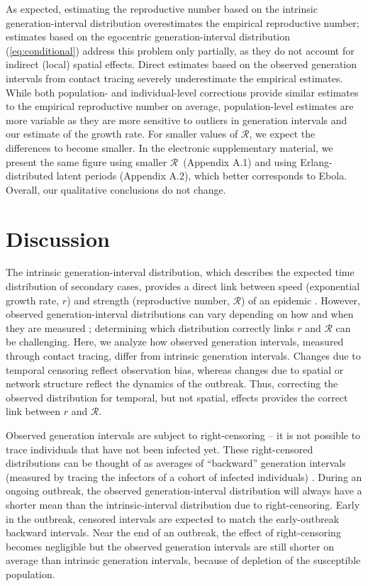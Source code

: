 \documentclass[12pt]{article}
\newcommand{\eref}[1]{(\ref{eq:#1})}
\newcommand{\RR}{\ensuremath{{\mathcal R}}}
\begin{document}
As expected, estimating the reproductive number based on the intrinsic generation-interval distribution overestimates the empirical reproductive number;
estimates based on the egocentric generation-interval distribution \eref{conditional} address this problem only partially, as they do not account for indirect (local) spatial effects. 
Direct estimates based on the observed generation intervals from contact tracing severely underestimate the empirical estimates.
While both population- and individual-level corrections provide similar estimates to the empirical reproductive number on average,
population-level estimates are more variable as they are more sensitive to outliers in generation intervals and our estimate of the growth rate.
For smaller values of \RR, we expect the differences to become smaller.
In the electronic supplementary material, we present the same figure using smaller \RR\ (Appendix A.1) and using Erlang-distributed latent periods (Appendix A.2), which better corresponds to Ebola.
Overall, our qualitative conclusions do not change.

\section{Discussion}

The intrinsic generation-interval distribution, which describes the expected time distribution of secondary cases, provides a direct link between speed (exponential growth rate, $r$) and strength (reproductive number, $\RR$) of an epidemic \citep{wallinga2007generation, svensson2007note, svensson2015influence, park2019practical}.
However, observed generation-interval distributions can vary depending on how and when they are measured \citep{nishiura2010time, tomba2010some, champredon2015intrinsic, britton2019estimation};
determining which distribution correctly links $r$ and $\RR$ can be challenging.
Here, we analyze how observed generation intervals, measured through contact tracing, differ from intrinsic generation intervals.
Changes due to temporal censoring reflect observation bias, whereas changes due to spatial or network structure reflect the dynamics of the outbreak.
Thus, correcting the observed distribution for temporal, but not spatial, effects provides the correct link between $r$ and $\RR$.

Observed generation intervals are subject to right-censoring -- it is not possible to trace individuals that have not been infected yet.
These right-censored distributions can be thought of as averages of ``backward'' generation intervals (measured by tracing the infectors of a cohort of infected individuals) \citep{kenah2008generation, nishiura2010time, tomba2010some, champredon2015intrinsic, britton2019estimation}.
During an ongoing outbreak, the observed generation-interval distribution will always have a shorter mean than the intrinsic-interval distribution due to right-censoring.
Early in the outbreak, censored intervals are expected to match the early-outbreak backward intervals.
Near the end of an outbreak, the effect of right-censoring becomes negligible but the observed generation intervals are still shorter on average than intrinsic generation intervals, because of depletion of the susceptible population.
\end{document}
